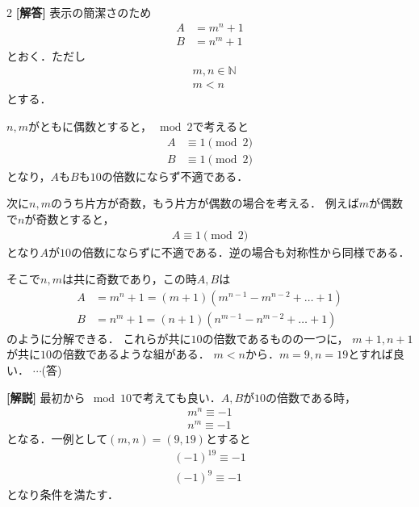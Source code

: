 \documentclass[../../main.tex]{subfiles}
\begin{document}
\setcounter{equation}{0}
\begin{oframed}
  
\end{oframed}
\setlength{\columnseprule}{0.4pt}
\begin{multicols}{2}
  {\bf [解答]}
  表示の簡潔さのため
  \begin{align}
    A & =m^n+1 \\
    B & =n^m+1
  \end{align}
  とおく．ただし
  \begin{align}
    & m,n \in \mathbb{N} \\
    & m<n
  \end{align}
  とする．

  $n,m$がともに偶数とすると，$\mod 2$で考えると
  \begin{align}
    A & \equiv 1 \pmod{2}\\
    B & \equiv 1 \pmod{2}
  \end{align}
  となり，$A$も$B$も$10$の倍数にならず不適である．

  次に$n,m$のうち片方が奇数，もう片方が偶数の場合を考える．
  例えば$m$が偶数で$n$が奇数とすると，
  \begin{align}
    A \equiv 1 \pmod{2}
  \end{align}
  となり$A$が$10$の倍数にならずに不適である．逆の場合も対称性から同様である．

  そこで$n,m$は共に奇数であり，この時$A,B$は
  \begin{align}
    A & = m^n+1 = (m+1)(m^{n-1}-m^{n-2}+\dots+1) \\
    B & = n^m+1 = (n+1)(n^{m-1}-n^{m-2}+\dots+1)
  \end{align}
  のように分解できる．
  これらが共に$10$の倍数であるものの一つに，
  $m+1, n+1$が共に$10$の倍数であるような組がある．
  $m<n$から．$m=9, n=19$とすれば良い．  $\cdots$(答)

  {\bf [解説]}
  最初から$\mod 10$で考えても良い．$A,B$が$10$の倍数である時，
  \begin{align}
    m^n \equiv -1 \\
    n^m \equiv -1
  \end{align}
  となる．一例として$(m,n)=(9,19)$とすると
  \begin{align}
    (-1)^{19} \equiv -1 \\
    (-1)^9 \equiv -1
  \end{align}
  となり条件を満たす．

  \newpage
\end{multicols}
\end{document}
